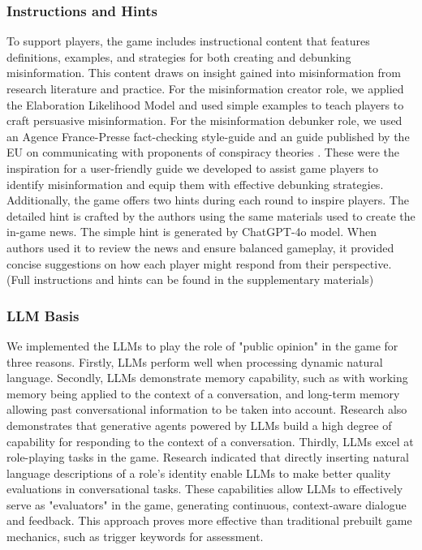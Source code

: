 \subsubsection{Instructions and Hints}
To support players, the game includes instructional content that features definitions\cite{molina2021fake,wu2019misinformation}, examples\cite{bbcCoronavirusBill}, and strategies for both creating and debunking misinformation. This content draws on insight gained into misinformation from research literature and practice. For the misinformation creator role, we applied the Elaboration Likelihood Model and used simple examples to teach players to craft persuasive misinformation\cite{petty1984source,moran2016makes}. For the misinformation debunker role, we used an Agence France-Presse fact-checking style-guide and an guide published by the EU on communicating with proponents of conspiracy theories \cite{afp2024,eeas2024}. These were the inspiration for a user-friendly guide we developed to assist game players to identify misinformation and equip them with effective debunking strategies. 
Additionally, the game offers two hints during each round to inspire players. The detailed hint is crafted by the authors using the same materials used to create the in-game news. The simple hint is generated by ChatGPT-4o model. When authors used it to review the news and ensure balanced gameplay, it provided concise suggestions on how each player might respond from their perspective. (Full instructions and hints can be found in the supplementary materials)

\subsubsection{LLM Basis}
We implemented the LLMs to play the role of "public opinion" in the game for three reasons.  Firstly, LLMs perform well when processing dynamic natural language\cite{hu2024survey}. Secondly, LLMs demonstrate memory capability, such as with working memory being applied to the context of a conversation, and long-term memory allowing past conversational information to be taken into account\cite{hu2024survey}. 
 Research also demonstrates that generative agents powered by LLMs build a high degree of capability for responding to the context of a conversation\cite{1park2023generative,yin2024lies}. Thirdly, LLMs excel at role-playing tasks in the game. Research indicated\cite{wang2023humanoid}\cite{hu2024survey} that directly inserting natural language descriptions of a role’s identity enable LLMs to make better quality evaluations in conversational tasks. These capabilities allow LLMs to effectively serve as "evaluators" in the game, generating continuous, context-aware dialogue and feedback. This approach proves more effective than traditional prebuilt game mechanics, such as trigger keywords for assessment. 

